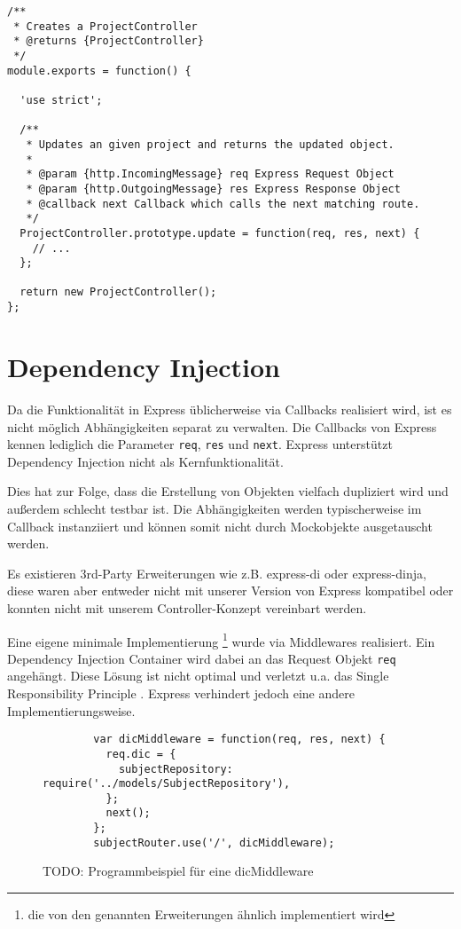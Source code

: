\begin{verbatim}
/**
 * Creates a ProjectController
 * @returns {ProjectController}
 */
module.exports = function() {

  'use strict';

  /**
   * Updates an given project and returns the updated object.
   *
   * @param {http.IncomingMessage} req Express Request Object
   * @param {http.OutgoingMessage} res Express Response Object
   * @callback next Callback which calls the next matching route.
   */
  ProjectController.prototype.update = function(req, res, next) {
    // ...
  };

  return new ProjectController();
};
\end{verbatim}
\lstset{basicstyle=\footnotesize\ttfamily, language=JavaScript, showspaces=false }
\section{Dependency Injection}\label{dependency-injection}

Da die Funktionalität in Express üblicherweise\cite{express-routing}
via Callbacks realisiert wird, ist es nicht möglich Abhängigkeiten
separat zu verwalten. Die Callbacks von Express kennen lediglich die
Parameter \texttt{req}, \texttt{res} und \texttt{next}. Express
unterstützt Dependency Injection nicht als Kernfunktionalität.

Dies hat zur Folge, dass die Erstellung von Objekten vielfach dupliziert
wird und außerdem schlecht testbar ist. Die Abhängigkeiten werden
typischerweise im Callback instanziiert und können somit nicht durch
Mockobjekte ausgetauscht werden.

Es existieren 3rd-Party Erweiterungen wie z.B. express-di\cite{express-di} oder
express-dinja\cite{express-dinja}, diese
waren aber entweder nicht mit unserer Version von Express kompatibel
oder konnten nicht mit unserem Controller-Konzept vereinbart werden.

Eine eigene minimale Implementierung \footnote{die von den genannten
Erweiterungen ähnlich implementiert wird} wurde via Middlewares
realisiert. Ein Dependency Injection Container wird dabei an das Request
Objekt \texttt{req} angehängt. Diese Lösung ist nicht optimal und
verletzt u.a. das Single Responsibility Principle
\cite{srp}. Express verhindert jedoch eine
andere Implementierungsweise.

\begin{figure}[t]
	\centering
	\begin{lstlisting}
		var dicMiddleware = function(req, res, next) {
		  req.dic = {
		    subjectRepository: require('../models/SubjectRepository'),
		  };
		  next();
		};
		subjectRouter.use('/', dicMiddleware);
	\end{lstlisting}
	\caption[dicMiddleware]{TODO: Programmbeispiel für eine dicMiddleware}
	\label{f:dicMiddleware}
\end{figure}

